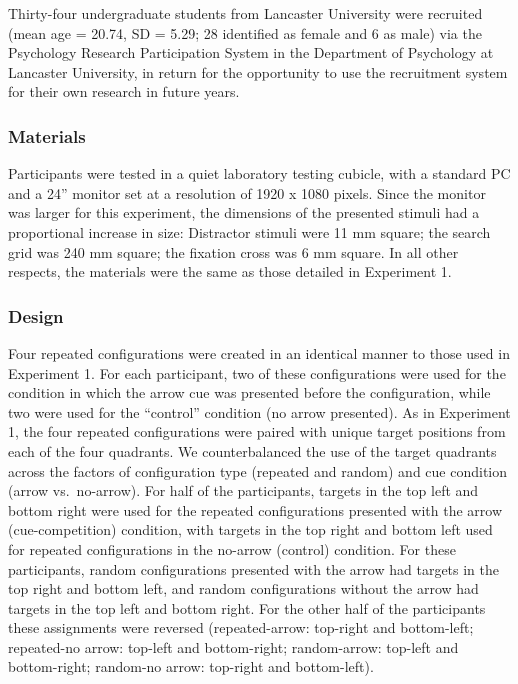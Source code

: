 \documentclass[
  man,
  floatsintext,
  longtable,
  nolmodern,
  notxfonts,
  notimes,
  colorlinks=true,linkcolor=blue,citecolor=blue,urlcolor=blue]{apa7}
\begin{document}
Thirty-four undergraduate students from Lancaster University were
recruited (mean age = 20.74, SD = 5.29; 28 identified as female and 6 as
male) via the Psychology Research Participation System in the Department
of Psychology at Lancaster University, in return for the opportunity to
use the recruitment system for their own research in future years.

\subsubsection{Materials}\label{materials-1}

Participants were tested in a quiet laboratory testing cubicle, with a
standard PC and a 24'' monitor set at a resolution of 1920 x 1080
pixels. Since the monitor was larger for this experiment, the dimensions
of the presented stimuli had a proportional increase in size: Distractor
stimuli were 11 mm square; the search grid was 240 mm square; the
fixation cross was 6 mm square. In all other respects, the materials
were the same as those detailed in Experiment 1.

\subsubsection{Design}\label{design-1}

Four repeated configurations were created in an identical manner to
those used in Experiment 1. For each participant, two of these
configurations were used for the condition in which the arrow cue was
presented before the configuration, while two were used for the
``control'' condition (no arrow presented). As in Experiment 1, the four
repeated configurations were paired with unique target positions from
each of the four quadrants. We counterbalanced the use of the target
quadrants across the factors of configuration type (repeated and random)
and cue condition (arrow vs.~no-arrow). For half of the participants,
targets in the top left and bottom right were used for the repeated
configurations presented with the arrow (cue-competition) condition,
with targets in the top right and bottom left used for repeated
configurations in the no-arrow (control) condition. For these
participants, random configurations presented with the arrow had targets
in the top right and bottom left, and random configurations without the
arrow had targets in the top left and bottom right. For the other half
of the participants these assignments were reversed (repeated-arrow:
top-right and bottom-left; repeated-no arrow: top-left and bottom-right;
random-arrow: top-left and bottom-right; random-no arrow: top-right and
bottom-left).
\end{document}
